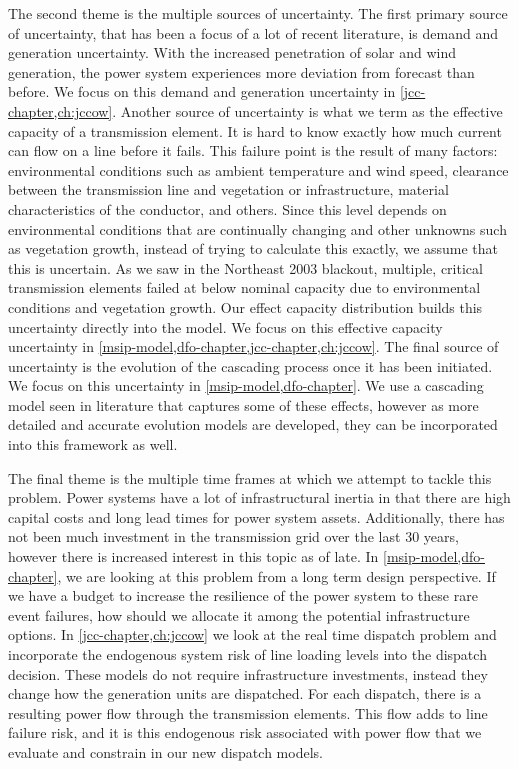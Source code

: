 The second theme is the multiple sources of uncertainty.  The first primary source of uncertainty, that has been a focus of a lot of recent literature, is demand and generation uncertainty.  With the increased penetration of solar and wind generation, the power system experiences more deviation from forecast than before.  We focus on this demand and generation uncertainty in \cref{jcc-chapter,ch:jccow}.  Another source of uncertainty is what we term as the effective capacity of a transmission element.  It is hard to know exactly how much current can flow on a line before it fails.  This failure point is the result of many factors: environmental conditions such as ambient temperature and wind speed, clearance between the transmission line and vegetation or infrastructure, material characteristics of the conductor, and others.  Since this level depends on environmental conditions that are continually changing and other unknowns such as vegetation growth, instead of trying to calculate this exactly, we assume that this is uncertain.  As we saw in the Northeast 2003 blackout, multiple, critical transmission elements failed at below nominal capacity due to environmental conditions and vegetation growth.  Our effect capacity distribution builds this uncertainty directly into the model.  We focus on this effective capacity uncertainty in \cref{msip-model,dfo-chapter,jcc-chapter,ch:jccow}.  The final source of uncertainty is the evolution of the cascading process once it has been initiated.  We focus on this uncertainty in \cref{msip-model,dfo-chapter}.  We use a cascading model seen in literature that captures some of these effects, however as more detailed and accurate evolution models are developed, they can be incorporated into this framework as well.  

The final theme is the multiple time frames at which we attempt to tackle this problem.  Power systems have a lot of infrastructural inertia in that there are high capital costs and long lead times for power system assets.  Additionally, there has not been much investment in the transmission grid over the last 30 years, however there is increased interest in this topic as of late.  In \cref{msip-model,dfo-chapter}, we are looking at this problem from a long term design perspective.  If we have a budget to increase the resilience of the power system to these rare event failures, how should we allocate it among the potential infrastructure options.  In \cref{jcc-chapter,ch:jccow} we look at the real time dispatch problem and incorporate the endogenous system risk of line loading levels into the dispatch decision. These models do not require infrastructure investments, instead they change how the generation units are dispatched.  For each dispatch, there is a resulting power flow through the transmission elements.  This flow adds to line failure risk, and it is this endogenous risk associated with power flow that we evaluate and constrain in our new dispatch models.


